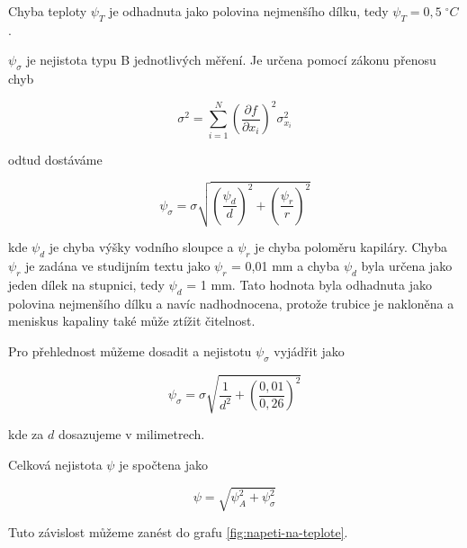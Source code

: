 Chyba teploty $\psi_T$ je odhadnuta jako polovina nejmenšího dílku, tedy $\psi_T = 0,5 \; ^\circ C$.

$\psi_{\sigma}$ je nejistota typu B jednotlivých měření. Je určena pomocí zákonu přenosu chyb

\begin{equation}
    \sigma^2 = \sum_{i=1}^{N} \left( \frac{\partial f}{\partial x_i} \right)^2 \sigma^2_{x_i}
\end{equation}

\newpage

odtud dostáváme

\begin{equation}
    \psi_{\sigma} = \sigma \sqrt{\left( \frac{\psi_d}{d} \right)^2 + \left( \frac{\psi_r}{r} \right)^2}
\end{equation}

kde $\psi_d$ je chyba výšky vodního sloupce a $\psi_r$ je chyba poloměru kapiláry. Chyba $\psi_r$ je zadána ve studijním textu jako $\psi_r$ = 0,01 mm a chyba $\psi_d$ byla určena jako jeden dílek na stupnici, tedy $\psi_d$ = 1 mm. Tato hodnota byla odhadnuta jako polovina nejmenšího dílku a navíc nadhodnocena, protože trubice je nakloněna a meniskus kapaliny také může ztížit čitelnost.

Pro přehlednost můžeme dosadit a nejistotu $\psi_\sigma$ vyjádřit jako

\begin{equation}
    \psi_\sigma = \sigma \sqrt{\frac{1}{d^2} + \left( \frac{0,01}{0,26} \right)^2}
\end{equation}

kde za $d$ dosazujeme v milimetrech.

Celková nejistota $\psi$ je spočtena jako

\begin{equation}
    \psi = \sqrt{\psi^2_A + \psi^2_{\sigma}}
\end{equation}

Tuto závislost můžeme zanést do grafu \ref{fig:napeti-na-teplote}.

